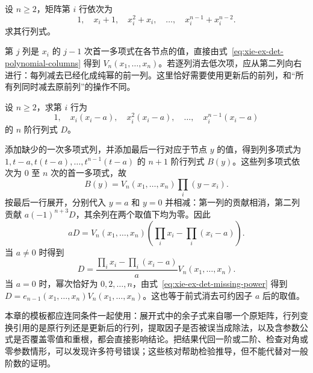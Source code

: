 \begin{example}
\label{ex:xie-ex-det-neighboring-powers}
设 $n\geq2$，矩阵第 $i$ 行依次为
\[
1,\quad x_i+1,\quad x_i^2+x_i,\quad\ldots,\quad x_i^{n-1}+x_i^{n-2}.
\]
求其行列式。
\end{example}

\begin{solve}
第 $j$ 列是 $x_i$ 的 $j-1$ 次首一多项式在各节点的值，直接由式~\eqref{eq:xie-ex-det-polynomial-columns} 得到 $V_n(x_1,\ldots,x_n)$。若逐列消去低次项，应从第二列向右进行：每列减去已经化成纯幂的前一列。这里恰好需要使用更新后的前列，和“所有列同时减去原前列”的操作不同。
\end{solve}

\begin{example}
\label{ex:xie-ex-det-shifted-missing-power}
设 $n\geq2$，求第 $i$ 行为
\[
1,\quad x_i(x_i-a),\quad x_i^2(x_i-a),\quad\ldots,\quad x_i^{n-1}(x_i-a)
\]
的 $n$ 阶行列式 $D$。
\end{example}

\begin{solve}
添加缺少的一次多项式列，并添加最后一行对应于节点 $y$ 的值，得到列多项式为 $1,t-a,t(t-a),\ldots,t^{n-1}(t-a)$ 的 $n+1$ 阶行列式 $B(y)$。这些列多项式依次为 $0$ 至 $n$ 次的首一多项式，故
\[
B(y)=V_n(x_1,\ldots,x_n)\prod_i(y-x_i).
\]
按最后一行展开，分别代入 $y=a$ 和 $y=0$ 并相减：第一列的贡献相消，第二列贡献 $a(-1)^{n+3}D$，其余列在两个取值下均为零。因此
\[
aD=V_n(x_1,\ldots,x_n)\left(\prod_i x_i-\prod_i(x_i-a)\right).
\]
当 $a\ne0$ 时得到
\begin{equation}
\label{eq:xie-ex-det-shifted-missing-power}
D=\frac{\prod_i x_i-\prod_i(x_i-a)}{a}V_n(x_1,\ldots,x_n).
\end{equation}
当 $a=0$ 时，幂次恰好为 $0,2,\ldots,n$，由式~\eqref{eq:xie-ex-det-missing-power} 得到 $D=e_{n-1}(x_1,\ldots,x_n)V_n(x_1,\ldots,x_n)$。这也等于前式消去可约因子 $a$ 后的取值。
\end{solve}

本章的模板都应连同条件一起使用：展开式中的余子式来自哪一个原矩阵，行列变换引用的是原行列还是更新后的行列，提取因子是否被误当成除法，以及含参数公式是否覆盖零值和重根，都会直接影响结论。把结果代回一阶或二阶、检查对角或零参数情形，可以发现许多符号错误；这些核对帮助检验推导，但不能代替对一般阶数的证明。





